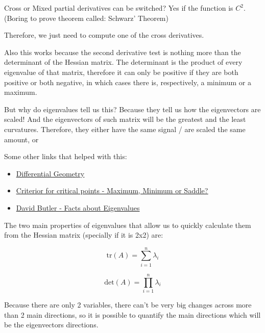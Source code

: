 Cross or Mixed partial derivatives can be switched? Yes if the function is $C^2$. 
(Boring to prove theorem called: Schwarz' Theorem)

Therefore, we just need to compute one of the cross derivatives.


Also this works because the second derivative test is nothing more than the determinant of the Hessian matrix. The determinant is the product of every eigenvalue of that matrix, therefore it can only be positive if they are both positive or both negative, in which cases there is, respectively, a minimum or a maximum. 

But why do eigenvalues tell us this? Because they tell us how the eigenvectors are scaled! And the eigenvectors of such matrix will be the greatest and the least curvatures. Therefore, they either have the same signal / are scaled the same amount, or 



Some other links that helped with this:
\begin{itemize}
    \item \href{http://homepages.inf.ed.ac.uk/rbf/CVonline/LOCAL_COPIES/MORSE/diffgeom.pdf}{\ul{Differential Geometry}}
    \item \href{http://math.mit.edu/classes/18.013A/HTML/chapter11/section02.html}{\ul{Criterior for critical points - Maximum, Minimum or Saddle?}}
    \item \href{https://www.adelaide.edu.au/mathslearning/play/seminars/evalue-magic-tricks-handout.pdf}{David Butler - Facts about Eigenvalues}
\end{itemize}


The two main properties of eigenvalues that allow us to quickly calculate them from the Hessian matrix (specially if it is 2x2) are:

\begin{equation}
    \text{tr}(A) = \sum^n_{i = 1} \lambda_i    
\end{equation}

\begin{equation}
    \text{det}(A) = \prod^n_{i = 1} \lambda_i
\end{equation}

Because there are only 2 variables, there can't be very big changes across more than 2 main directions, so it is possible to quantify the main directions which will be the eigenvectors directions.













